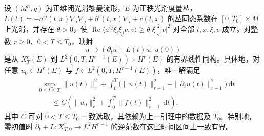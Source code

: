 \begin{theorem}\label{g3:thm:linear-parabolic-isomorphism}
	设 \((M^n,g)\) 为正维闭光滑黎曼流形，\(E\) 为正秩光滑度量丛，\(L(t)=-a^{ij}(t,x)\nabla_i\nabla_j+b^i(t,x)\nabla_i+c(t,x)\) 的丛同态系数在 \([0,T_0]\times M\) 上光滑，并存在 \(\theta>0\)，使 \(\operatorname{Re}\langle a^{ij}\xi_i\xi_jv,v\rangle\ge\theta|\xi|_g^2|v|^2\) 对全部 \(t,x,\xi,v\) 成立。对整数 \(r\ge0\)、\(0<T\le T_0\)，映射
	\[
		u\longmapsto(\partial_tu+L(t)u,\ u(0))
	\]
	是从 \(X_T^r(E)\) 到 \(L^2(0,T;H^{r-1}(E))\times H^r(E)\) 的有界线性同构。具体地，对任意 \(u_0\in H^r(E)\) 与 \(f\in L^2(0,T;H^{r-1}(E))\)，唯一解满足
	\begin{equation}\label{g3:eq:linear-parabolic-energy}
		\begin{split}
		&\sup_{0\le t\le T}\|u(t)\|_r^2
		+\int_0^T\bigl(\|u(t)\|_{r+1}^2+\|\partial_tu(t)\|_{r-1}^2\bigr)\,\mathrm dt\\
		&\qquad\le C\left(\|u_0\|_r^2+\int_0^T\|f(t)\|_{r-1}^2\,\mathrm dt\right).
		\end{split}
	\end{equation}
	其中 \(C\) 可对 \(0<T\le T_0\) 一致选取，其依赖为上一引理中的数据及 \(T_0\)。特别地，零初值时 \(\partial_t+L:X_{T,0}^r\to L^2H^{r-1}\) 的逆范数在这些时间区间上一致有界。
\end{theorem}
